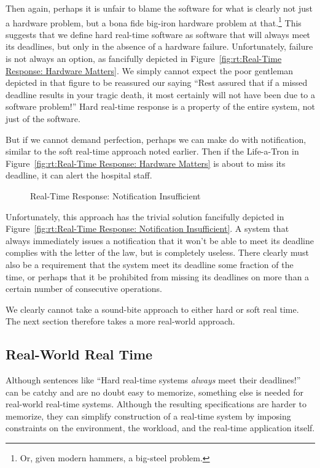Then again, perhaps it is unfair to blame the software for what is clearly
not just a hardware problem, but a bona fide big-iron hardware problem
at that.\footnote{
	Or, given modern hammers, a big-steel problem.}
This suggests that we define hard real-time software as software that
will always meet its deadlines, but only in the absence of a hardware
failure.
Unfortunately, failure is not always an option, as fancifully depicted in
Figure~\ref{fig:rt:Real-Time Response: Hardware Matters}.
We simply cannot expect the poor gentleman depicted in that figure to be
reassured our saying ``Rest assured that if a missed deadline results
in your tragic death, it most certainly will not have been due to a
software problem!''
Hard real-time response is a property of the entire system, not
just of the software.

But if we cannot demand perfection, perhaps we can make do with
notification, similar to the soft real-time approach noted earlier.
Then if the Life-a-Tron in
Figure~\ref{fig:rt:Real-Time Response: Hardware Matters}
is about to miss its deadline,
it can alert the hospital staff.

\begin{figure}[bt]
\centering
{}
\caption{Real-Time Response: Notification Insufficient}
\end{figure}

Unfortunately, this approach has the trivial solution fancifully depicted in
Figure~\ref{fig:rt:Real-Time Response: Notification Insufficient}.
A system that always immediately issues a notification that it won't
be able to meet its deadline complies with the letter of the law,
but is completely useless.
There clearly must also be a requirement that the system meet its deadline
some fraction of the time, or perhaps that it be prohibited from missing
its deadlines on more than a certain number of consecutive operations.

We clearly cannot take a sound-bite approach to either hard or soft
real time.
The next section therefore takes a more real-world approach.

\subsection{Real-World Real Time}
\label{sec:rt:Real-World Real Time}

Although sentences like ``Hard real-time systems \emph{always} meet
their deadlines!'' can be catchy and are no doubt easy to memorize,
something else is needed for real-world real-time systems.
Although the resulting specifications are
harder to memorize, they can simplify construction of a real-time
system by imposing constraints on the environment, the workload, and
the real-time application itself.

